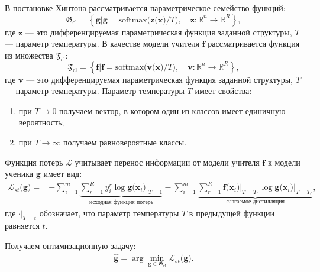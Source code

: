 \documentclass{dissert}
\begin{document}
В постановке Хинтона рассматривается параметрическое семейство функций:
\[
\label{eq:G:set:cl}
\mathfrak{G}_{\text{cl}} = \left\{\mathbf{g}| \mathbf{g} = \text{softmax}\bigr(\mathbf{z}\bigr(\mathbf{x}\bigr)/T\bigr), \quad \mathbf{z}: \mathbb{R}^n \to \mathbb{R}^R \right\},
\]
где $\mathbf{z}$ --- это дифференцируемая параметрическая функция заданной структуры, $T$ --- параметр температуры. В качестве модели учителя $\mathbf{f}$ рассматривается функция из множества $\mathfrak{F}_{\text{cl}}$:
\[
\label{eq:F:set:cl}
\mathfrak{F}_{\text{cl}} = \left\{\mathbf{f}| \mathbf{f} = \text{softmax}\bigr(\mathbf{v}\bigr(\mathbf{x}\bigr)/T\bigr), \quad \mathbf{v}: \mathbb{R}^n \to \mathbb{R}^R \right\},
\]
где $\mathbf{v}$ --- это дифференцируемая параметрическая функция заданной структуры, $T$ --- параметр температуры.
Параметр температуры $T$ имеет свойства:
\begin{enumerate}[1)]
    \item при $T\to 0$ получаем вектор, в котором один из классов имеет единичную вероятность;
    \item при $T\to \infty$ получаем равновероятные классы.
\end{enumerate}

Функция потерь $\mathcal{L}$ учитывает перенос информации от модели учителя $\mathbf{f}$ к модели ученика $\mathbf{g}$ имеет вид:
\[
\label{eq:hinton:1}
\begin{aligned}
   \mathcal{L}_{st}\bigr(\mathbf{g}\bigr) = &-\sum_{i=1}^{m}\underbrace{{\sum_{r=1}^{R}y^r_i\log\mathbf{g}\bigr(\mathbf{x}_i\bigr)\bigr|_{T=1}}}_{\text{исходная функция потерь}}
   -\sum_{i=1}^{m}\underbrace{{\sum_{r=1}^{R}\mathbf{f}\bigr(\mathbf{x}_i\bigr)\bigr|_{T=T_0}\log\mathbf{g}\bigr(\mathbf{x}_i\bigr)\bigr|_{T=T_0}}}_{\text{слагаемое дистилляция}},
\end{aligned}
\]
где $\cdot\bigr|_{T=t}$ обозначает, что параметр температуры $T$ в предыдущей функции равняется $t$.

Получаем оптимизационную задачу:
\[
\label{eq:hinton:opt}
\begin{aligned}
   \hat{\mathbf{g}} = \arg\min_{\mathbf{g} \in \mathfrak{G}_{\text{cl}}} \mathcal{L}_{st}\bigr(\mathbf{g}\bigr).
\end{aligned}
\]
\end{document}
